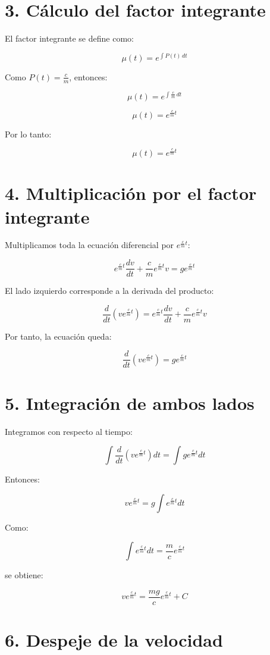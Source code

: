 \documentclass[12pt,letterpaper]{article}
\begin{document}
\section*{3. Cálculo del factor integrante}

El factor integrante se define como:

\[
\mu(t)=e^{\int P(t)\,dt}
\]

Como \(P(t)=\frac{c}{m}\), entonces:

\[
\mu(t)=e^{\int \frac{c}{m}\,dt}
\]

\[
\mu(t)=e^{\frac{c}{m}t}
\]

Por lo tanto:

\[
\boxed{\mu(t)=e^{\frac{c}{m}t}}
\]

\section*{4. Multiplicación por el factor integrante}

Multiplicamos toda la ecuación diferencial por \(e^{\frac{c}{m}t}\):

\[
e^{\frac{c}{m}t}\frac{dv}{dt}+\frac{c}{m}e^{\frac{c}{m}t}v=ge^{\frac{c}{m}t}
\]

El lado izquierdo corresponde a la derivada del producto:

\[
\frac{d}{dt}\left(v e^{\frac{c}{m}t}\right)=e^{\frac{c}{m}t}\frac{dv}{dt}+\frac{c}{m}e^{\frac{c}{m}t}v
\]

Por tanto, la ecuación queda:

\[
\frac{d}{dt}\left(v e^{\frac{c}{m}t}\right)=ge^{\frac{c}{m}t}
\]

\section*{5. Integración de ambos lados}

Integramos con respecto al tiempo:

\[
\int \frac{d}{dt}\left(v e^{\frac{c}{m}t}\right)dt=\int ge^{\frac{c}{m}t}dt
\]

Entonces:

\[
v e^{\frac{c}{m}t}=g\int e^{\frac{c}{m}t}dt
\]

Como:

\[
\int e^{\frac{c}{m}t}dt=\frac{m}{c}e^{\frac{c}{m}t}
\]

se obtiene:

\[
v e^{\frac{c}{m}t}=\frac{mg}{c}e^{\frac{c}{m}t}+C
\]

\section*{6. Despeje de la velocidad}
\end{document}
